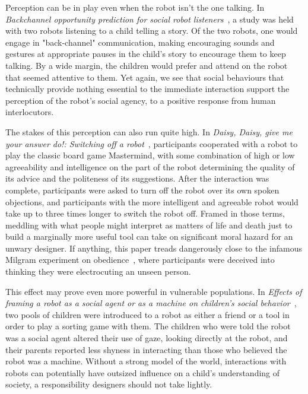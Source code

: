 \documentclass{sfuthesis}
\begin{document}
Perception can be in play even when the robot isn't the one talking. In \textit{Backchannel opportunity prediction for social robot listeners}~\cite{park2017backchannel}, a study was held with two robots listening to a child telling a story. Of the two robots, one would engage in "back-channel" communication, making encouraging sounds and gestures at appropriate pauses in the child's story to encourage them to keep talking. By a wide margin, the children would prefer and attend on the robot that seemed attentive to them. Yet again, we see that social behaviours that technically provide nothing essential to the immediate interaction support the perception of the robot's social agency, to a positive response from human interlocutors.

The stakes of this perception can also run quite high. In \textit{Daisy, Daisy, give me your answer do!: Switching off a robot}~\cite{bartneck2007daisy}, participants cooperated with a robot to play the classic board game Mastermind, with some combination of high or low agreeability and intelligence on the part of the robot determining the quality of its advice and the politeness of its suggestions. After the interaction was complete, participants were asked to turn off the robot over its own spoken objections, and participants with the more intelligent and agreeable robot would take up to three times longer to switch the robot off. Framed in those terms, meddling with what people might interpret as matters of life and death just to build a marginally more useful tool can take on significant moral hazard for an unwary designer. If anything, this paper treads dangerously close to the infamous Milgram experiment on obedience~\cite{miligram1974obedience}, where participants were deceived into thinking they were electrocuting an unseen person.

This effect may prove even more powerful in vulnerable populations. In \textit{Effects of framing a robot as a social agent or as a machine on children's social behavior}~\cite{westlund2016effects}, two pools of children were introduced to a robot as either a friend or a tool in order to play a sorting game with them. The children who were told the robot was a social agent altered their use of gaze, looking directly at the robot, and their parents reported less shyness in interacting than those who believed the robot was a machine. Without a strong model of the world, interactions with robots can potentially have outsized influence on a child's understanding of society, a responsibility designers should not take lightly.
\end{document}
